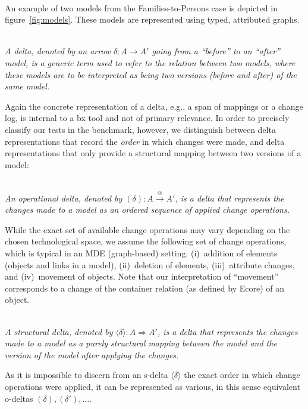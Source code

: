 \begin{example}[Models]~\\
An example of two models from the Families-to-Persons case is depicted in figure~\ref{fig:models}.
These models are represented using typed, attributed graphs.
\end{example}

\begin{definition}[Delta]
\label{def: delta}~\\
\emph{A delta, denoted by an arrow $\delta: A \rightarrow A'$ going from a ``before'' to an ``after'' model, is a generic term used to refer to the relation between two models, where these models are to be interpreted as being two versions (before and after) of the same model.}
\end{definition}
%
Again the concrete representation of a delta, e.g., a span of mappings or a change log, is internal to a bx tool and not of primary relevance.
In order to precisely classify our tests in the benchmark, however, we distinguish between delta representations that record the \emph{order} in which changes were made, and delta representations that only provide a structural mapping between two versions of a model:  

\begin{definition}
\label{def: o-delta}~\\
\emph{An operational delta, denoted by $(\delta): A \stackrel{@}{\rightarrow} A'$, is a delta that represents the changes made to a model as an ordered sequence of applied change operations.}
\end{definition}
%
While the exact set of available change operations may vary depending on the chosen technological space, we assume the following set of change operations, which is typical in an MDE (graph-based) setting:  (i)~addition of elements (objects and links in a model), (ii)~deletion of elements, (iii)~attribute changes, and (iv)~movement of objects.
Note that our interpretation of ``movement'' corresponds to a change of the container relation (as defined by Ecore) of an object.

\begin{definition}
\label{def: s-delta}~\\
\emph{A structural delta, denoted by $\langle\delta\rangle: A \Rightarrow A'$, is a delta that represents the changes made to a model as a purely structural mapping between the model and the version of the model after applying the changes.}
\end{definition}
%
As it is impossible to discern from an s-delta $\langle\delta\rangle$ the exact order in which change operations were applied, it can be represented as various, in this sense equivalent o-deltas $(\delta), (\delta'), ...$.

